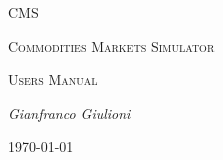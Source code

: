 \documentclass{article}
\begin{document}
\begin{titlepage}

	\begin{center}
	{\color{blue}\scshape\Huge CMS \par}
	\end{center}

	\vspace{2cm}

	\noindent
	{\color{blue}\scshape\Huge C}{\scshape\LARGE ommodities} 
	{\color{blue}\scshape\Huge M}{\scshape\LARGE arkets} 
	{\color{blue}\scshape\Huge S}{\scshape\LARGE imulator}\\



 
	
	\vspace{1.5cm}
	\noindent
	{\scshape\Huge Users Manual \par}

	\vspace{2cm}
	\noindent
	{\Large\itshape Gianfranco Giulioni\par}
	\vfill


	{\large \today\par}
\end{titlepage}
\end{document}
